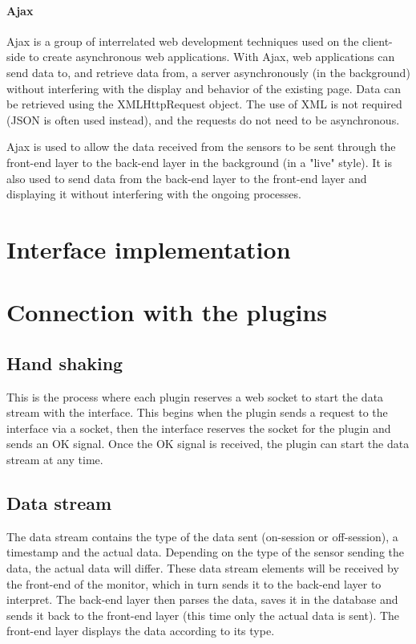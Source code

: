 \paragraph{Ajax}
Ajax is a group of interrelated web development techniques used on the client-side to create asynchronous web applications. With Ajax, web applications can send data to, and retrieve data from, a server asynchronously (in the background) without interfering with the display and behavior of the existing page. Data can be retrieved using the XMLHttpRequest object. The use of XML is not required (JSON is often used instead), and the requests do not need to be asynchronous.

Ajax is used to allow the data received from the sensors to be sent through the front-end layer to the back-end layer in the background (in a "live" style). It is also used to send data from the back-end layer to the front-end layer and displaying it without interfering with the ongoing processes.

\section{Interface implementation}

\section{Connection with the plugins}

\subsection{Hand shaking}
This is the process where each plugin reserves a web socket to start the data stream with the interface. This begins when the plugin sends a request to the interface via a socket, then the interface reserves the socket for the plugin and sends an OK signal. Once the OK signal is received, the plugin can start the data stream at any time.

\subsection{Data stream}
The data stream contains the type of the data sent (on-session or off-session), a timestamp and the actual data. Depending on the type of the sensor sending the data, the actual data will differ. These data stream elements will be received by the front-end of the monitor, which in turn sends it to the back-end layer to interpret. The back-end layer then parses the data, saves it in the database and sends it back to the front-end layer (this time only the actual data is sent). The front-end layer displays the data according to its type.